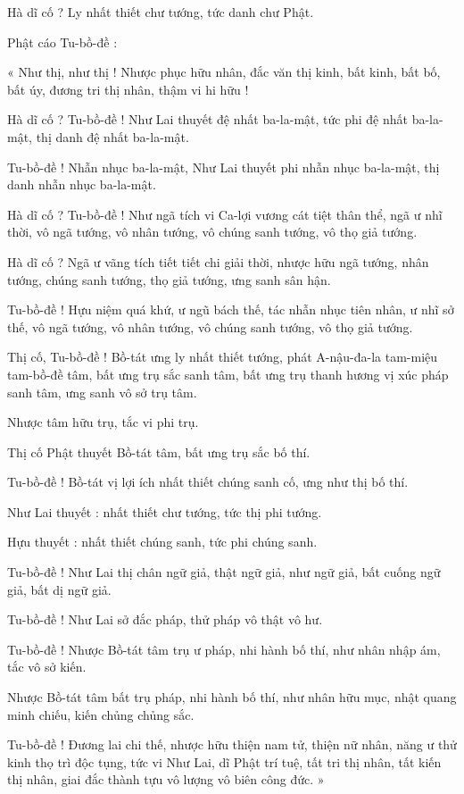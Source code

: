 	Hà dĩ cố ? Ly nhất thiết chư tướng, tức danh chư Phật.
	
	Phật cáo Tu-bồ-đề :
	
	« Như thị, như thị ! Nhược phục hữu nhân, đắc văn thị kinh, bất kinh, bất bố, bất úy, đương tri thị nhân, thậm vi hi hữu ! 
	
	Hà dĩ cố ? Tu-bồ-đề ! Như Lai thuyết đệ nhất ba-la-mật, tức phi đệ nhất ba-la-mật, thị danh đệ nhất ba-la-mật. 
	
	Tu-bồ-đề ! Nhẫn nhục ba-la-mật, Như Lai thuyết phi nhẫn nhục ba-la-mật, thị danh nhẫn nhục ba-la-mật. 
	
	Hà dĩ cố ? Tu-bồ-đề ! Như ngã tích vi Ca-lợi vương cát tiệt thân thể, ngã ư nhĩ thời, vô ngã tướng, vô nhân tướng, vô chúng sanh tướng, vô thọ giả tướng. 
	
	Hà dĩ cố ? Ngã ư vãng tích tiết tiết chi giải thời, nhược hữu ngã tướng, nhân tướng, chúng sanh tướng, thọ giả tướng, ưng sanh sân hận.
	
	Tu-bồ-đề ! Hựu niệm quá khứ, ư ngũ bách thế, tác nhẫn nhục tiên nhân, ư nhĩ sở thế, vô ngã tướng, vô nhân tướng, vô chúng sanh tướng, vô thọ giả tướng.
	
	Thị cố, Tu-bồ-đề ! Bồ-tát ưng ly nhất thiết tướng, phát A-nậu-đa-la tam-miệu tam-bồ-đề tâm, bất ưng trụ sắc sanh tâm, bất ưng trụ thanh hương vị xúc pháp sanh tâm, ưng sanh vô sở trụ tâm. 
	
	Nhược tâm hữu trụ, tắc vi phi trụ. 
	
	Thị cố Phật thuyết Bồ-tát tâm, bất ưng trụ sắc bố thí. 
	
	Tu-bồ-đề ! Bồ-tát vị lợi ích nhất thiết chúng sanh cố, ưng như thị bố thí. 
	
	Như Lai thuyết : nhất thiết chư tướng, tức thị phi tướng. 
	
	Hựu thuyết : nhất thiết chúng sanh, tức phi chúng sanh.
	
	Tu-bồ-đề ! Như Lai thị chân ngữ giả, thật ngữ giả, như ngữ giả, bất cuống ngữ giả, bất dị ngữ giả. 
	
	Tu-bồ-đề ! Như Lai sở đắc pháp, thử pháp vô thật vô hư.
	
	Tu-bồ-đề ! Nhược Bồ-tát tâm trụ ư pháp, nhi hành bố thí, như nhân nhập ám, tắc vô sở kiến. 
	
	Nhược Bồ-tát tâm bất trụ pháp, nhi hành bố thí, như nhân hữu mục, nhật quang minh chiếu, kiến chủng chủng sắc.
	
	Tu-bồ-đề ! Đương lai chi thế, nhược hữu thiện nam tử, thiện nữ nhân, năng ư thử kinh thọ trì độc tụng, tức vi Như Lai, dĩ Phật trí tuệ, tất tri thị nhân, tất kiến thị nhân, giai đắc thành tựu vô lượng vô biên công đức. »
	
